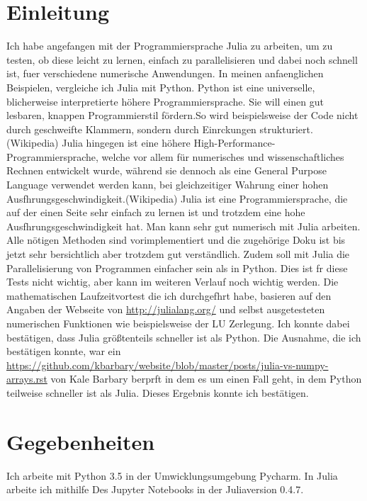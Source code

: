 \documentclass[a4paper, 11pt]{article}
\begin{document}
\tableofcontents

\setlength{\parindent}{0pt}

\newpage

\section{Einleitung}

Ich habe angefangen mit der Programmiersprache Julia zu arbeiten, um zu testen, ob diese leicht zu lernen, einfach zu parallelisieren und dabei noch schnell ist, fuer verschiedene numerische Anwendungen. 
In meinen anfaenglichen Beispielen, vergleiche ich Julia mit Python. 
Python ist eine universelle, blicherweise interpretierte h\"ohere Programmiersprache. Sie will einen gut lesbaren, knappen Programmierstil f\"ordern.So wird beispielsweise der Code nicht durch geschweifte Klammern, 
sondern durch Einrckungen strukturiert.(Wikipedia)
Julia hingegen ist eine h\"ohere High-Performance-Programmiersprache, welche vor allem f\"ur numerisches und wissenschaftliches Rechnen entwickelt wurde, w\"ahrend sie dennoch als eine General Purpose Language verwendet werden kann, 
bei gleichzeitiger Wahrung einer hohen Ausfhrungsgeschwindigkeit.(Wikipedia)
Julia ist eine Programmiersprache, die auf der einen Seite sehr einfach zu lernen ist und trotzdem eine hohe Ausfhrungsgeschwindigkeit hat. Man kann sehr gut numerisch mit Julia arbeiten. Alle n\"otigen Methoden sind vorimplementiert und 
die zugeh\"orige Doku ist bis jetzt sehr bersichtlich aber trotzdem gut verst\"andlich. Zudem soll mit Julia die Parallelisierung von Programmen einfacher sein als in Python. Dies ist fr diese Tests nicht wichtig, aber kann im weiteren Verlauf
noch wichtig werden.
Die mathematischen Laufzeitvortest die ich durchgefhrt habe, basieren auf den Angaben der Webseite von \url{http://julialang.org/} und selbst ausgetesteten numerischen Funktionen wie beispielsweise der LU Zerlegung. Ich konnte dabei best\"atigen, 
dass Julia gr\"o\ss{}tenteils schneller ist als Python.
Die Ausnahme, die ich best\"atigen konnte, war ein \url{https://github.com/kbarbary/website/blob/master/posts/julia-vs-numpy-arrays.rst} von Kale Barbary berprft in dem es um einen Fall geht, in dem Python teilweise schneller ist als Julia. 
Dieses Ergebnis konnte ich best\"atigen.

\section{Gegebenheiten}
Ich arbeite mit Python 3.5 in der Umwicklungsumgebung Pycharm. In Julia arbeite ich mithilfe Des Jupyter Notebooks in der Juliaversion 0.4.7.
\end{document}
